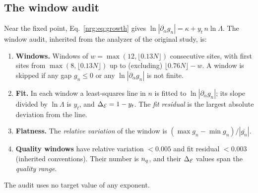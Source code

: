 \subsection{The window audit}\label{nrg:sec:windows}
Near the fixed point, Eq.~\eqref{nrg:eq:growth} gives $\ln|\partial_\alpha g_n|=\kappa+y_t\,n\ln\Lambda$. The window audit, inherited from
the analyzer of the original study, is:
\begin{enumerate}
\item \textbf{Windows.} Windows of $w=\max(12,\lfloor0.13N\rfloor)$ consecutive sites, with first sites from $\max(8,\lfloor0.13N\rfloor)$
  up to (excluding) $\lfloor0.76N\rfloor-w$. A window is skipped if any gap $g_n\le0$ or any $\ln|\partial_\alpha g_n|$ is not finite.
\item \textbf{Fit.} In each window a least-squares line in $n$ is fitted to $\ln|\partial_\alpha g_n|$; its slope divided by $\ln\Lambda$
  is $y_t$, and $\Delta_{\mathcal E}=1-y_t$. The \emph{fit residual} is the largest absolute deviation from the line.
\item \textbf{Flatness.} The \emph{relative variation} of the window is $(\max g_n-\min g_n)/|\overline{g_n}|$.
\item \textbf{Quality windows} have relative variation $<0.005$ and fit residual $<0.003$ (inherited conventions). Their number is
  $n_q$, and their $\Delta_{\mathcal E}$ values span the \emph{quality range}.
\end{enumerate}
The audit uses no target value of any exponent.


